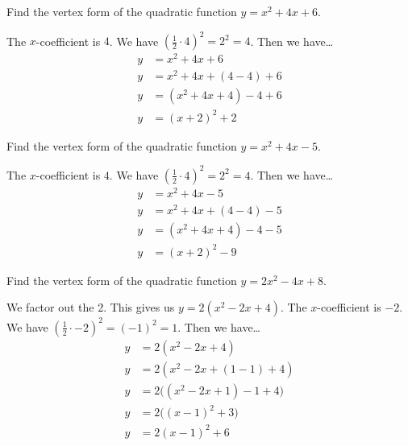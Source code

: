 \documentclass[11pt,letterpaper]{article}
\begin{document}

 Find the vertex form of the quadratic function $y= x^2 + 4x + 6$. \pspace

\sol The $x$-coefficient is $4$. We have $(\frac{1}{2} \cdot 4)^2= 2^2= 4$. Then we have\dots
	\[
	\begin{aligned}
	y&= x^2 + 4x + 6 \\[0.3cm]
	y&= x^2 + 4x + (4 - 4) + 6 \\[0.3cm]
	y&= (x^2 + 4x + 4) - 4 + 6 \\[0.3cm]
	y&= (x + 2)^2 + 2
	\end{aligned}
	\]





\newpage





 Find the vertex form of the quadratic function $y= x^2 + 4x - 5$. \pspace

\sol The $x$-coefficient is $4$. We have $(\frac{1}{2} \cdot 4)^2= 2^2= 4$. Then we have\dots
	\[
	\begin{aligned}
	y&= x^2 + 4x - 5 \\[0.3cm]
	y&= x^2 + 4x + (4 - 4) - 5 \\[0.3cm]
	y&= (x^2 + 4x + 4) - 4 - 5 \\[0.3cm]
	y&= (x + 2)^2 - 9
	\end{aligned}
	\]





\newpage





 Find the vertex form of the quadratic function $y= 2x^2 - 4x + 8$. \pspace

\sol We factor out the 2. This gives us $y= 2(x^2 - 2x + 4)$. The $x$-coefficient is $-2$. We have $(\frac{1}{2} \cdot -2)^2= (-1)^2= 1$. Then we have\dots
	\[
	\begin{aligned}
	y&= 2(x^2 - 2x + 4) \\[0.3cm]
	y&= 2(x^2 - 2x + (1 - 1) + 4) \\[0.3cm]
	y&= 2\big( (x^2 - 2x + 1) - 1 + 4 \big) \\[0.3cm]
	y&= 2\big( (x - 1)^2 + 3 \big) \\[0.3cm]
	y&= 2(x - 1)^2 + 6
	\end{aligned}
	\]
\end{document}
